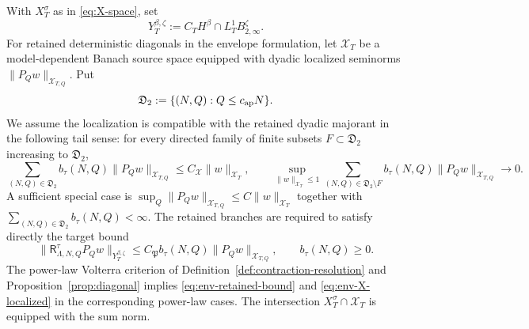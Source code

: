 \documentclass[11pt,reqno]{amsart}
\numberwithin{equation}{section}
\theoremstyle{plain}
\theoremstyle{definition}
\newcommand{\Ret}{\mathsf R}
\begin{document}
With \(X_T^\sigma\) as in \eqref{eq:X-space}, set
\begin{equation}\label{eq:env-source-target}
        Y_T^{\beta,\zeta}:=C_TH^\beta\cap L_T^1B_{2,\infty}^\zeta.
\end{equation}
For retained deterministic diagonals in the envelope formulation, let \(\mathcal X_T\) be a model-dependent Banach source space equipped with dyadic localized seminorms \(\|P_Qw\|_{\mathcal X_{T,Q}}\).  Put
\[
        \mathfrak D_2:=\{(N,Q):Q\le c_{\rm ap}N\}.
\]
We assume the localization is compatible with the retained dyadic majorant in the following tail sense: for every directed family of finite subsets \(F\subset\mathfrak D_2\) increasing to \(\mathfrak D_2\),
\begin{equation}\label{eq:env-X-localized}
        \sum_{(N,Q)\in\mathfrak D_2} b_\tau(N,Q)\|P_Qw\|_{\mathcal X_{T,Q}}
        \le C_{\mathcal X}\|w\|_{\mathcal X_T},
        \qquad
        \sup_{\|w\|_{\mathcal X_T}\le1}\sum_{(N,Q)\in\mathfrak D_2\setminus F} b_\tau(N,Q)\|P_Qw\|_{\mathcal X_{T,Q}}
        \longrightarrow0 .
\end{equation}
A sufficient special case is \(\sup_Q\|P_Qw\|_{\mathcal X_{T,Q}}\le C\|w\|_{\mathcal X_T}\) together with \(\sum_{(N,Q)\in\mathfrak D_2}b_\tau(N,Q)<\infty\).  The retained branches are required to satisfy directly the target bound
\begin{equation}\label{eq:env-retained-bound}
        \|\Ret_{\Lambda,N,Q}^\tau P_Qw\|_{Y_T^{\beta,\zeta}}
        \le C_{\mathfrak P} b_\tau(N,Q)\|P_Qw\|_{\mathcal X_{T,Q}},
        \qquad
        b_\tau(N,Q)\ge0.
\end{equation}
The power-law Volterra criterion of Definition~\ref{def:contraction-resolution} and Proposition~\ref{prop:diagonal} implies \eqref{eq:env-retained-bound} and \eqref{eq:env-X-localized} in the corresponding power-law cases.  The intersection \(X_T^\sigma\cap\mathcal X_T\) is equipped with the sum norm.
\end{document}

